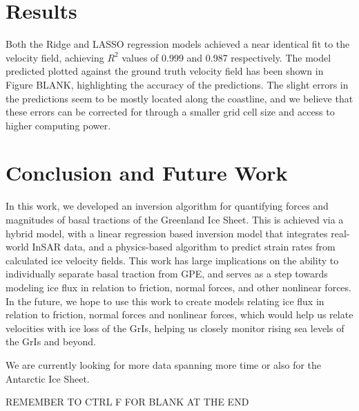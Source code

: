 \documentclass{article}
\begin{document}
\section{Results}

Both the Ridge and LASSO regression models achieved a near identical fit to the velocity field, achieving $R^{2}$ values of 0.999 and 0.987 respectively. The model predicted plotted against the ground truth velocity field has been shown in Figure BLANK, highlighting the accuracy of the predictions. The slight errors in the predictions seem to be mostly located along the coastline, and we believe that these errors can be corrected for through a smaller grid cell size and access to higher computing power. 



\section{Conclusion and Future Work}

In this work, we developed an inversion algorithm for quantifying forces and magnitudes of basal tractions of the Greenland Ice Sheet. This is achieved via a hybrid model, with a linear regression based inversion model that integrates real-world InSAR data, and a physics-based algorithm to predict strain rates from calculated ice velocity fields. This work has large implications on the ability to individually separate basal traction from GPE, and serves as a step towards modeling ice flux in relation to friction, normal forces, and other nonlinear forces. In the future, we hope to use this work to create models relating ice flux in relation to friction, normal forces and nonlinear forces, which would help us relate velocities with ice loss of the GrIs, helping us closely monitor rising sea levels of the GrIs and beyond.


We are currently looking for more data spanning more time or also for the Antarctic Ice Sheet.

REMEMBER TO CTRL F FOR BLANK AT THE END



\end{document}
